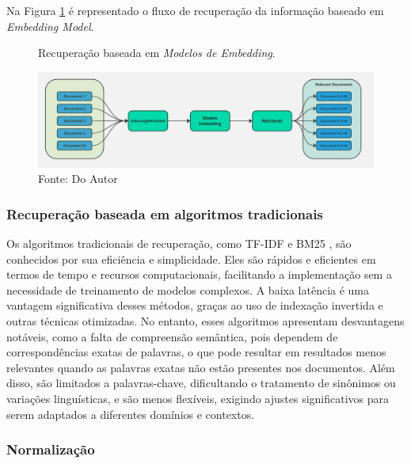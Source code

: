 Na Figura \ref{fig:retrieval1} é representado o fluxo de recuperação da informação baseado em \textit{Embedding Model}.

\begin{figure}[H]
    \centering
    \caption{Recuperação baseada em \textit{Modelos de Embedding}.}
    \includegraphics[width=\linewidth]{img/RAG/rag6.jpg}
    \caption*{ Fonte: Do Autor}
    \label{fig:retrieval1}
\end{figure}

\subsubsection {Recuperação baseada em algoritmos tradicionais}


Os algoritmos tradicionais de recuperação, como TF-IDF e BM25 \cite{askari2023injecting}, são conhecidos por sua eficiência e simplicidade. Eles são rápidos e eficientes em termos de tempo e recursos computacionais, facilitando a implementação sem a necessidade de treinamento de modelos complexos. A baixa latência é uma vantagem significativa desses métodos, graças ao uso de indexação invertida e outras técnicas otimizadas. No entanto, esses algoritmos apresentam desvantagens notáveis, como a falta de compreensão semântica, pois dependem de correspondências exatas de palavras, o que pode resultar em resultados menos relevantes quando as palavras exatas não estão presentes nos documentos. Além disso, são limitados a palavras-chave, dificultando o tratamento de sinônimos ou variações linguísticas, e são menos flexíveis, exigindo ajustes significativos para serem adaptados a diferentes domínios e contextos.


\subsubsection{Normalização}

